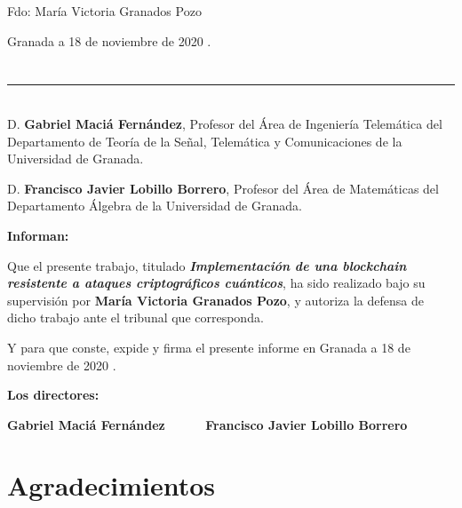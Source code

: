 \vspace{6cm}

\noindent Fdo: María Victoria Granados Pozo

\vspace{2cm}

\begin{flushright}
Granada a 18 de noviembre de 2020 .
\end{flushright}


\chapter*{}
\thispagestyle{empty}

\noindent\rule[-1ex]{\textwidth}{2pt}\\[4.5ex]

D. \textbf{Gabriel Maciá Fernández}, Profesor del Área de Ingeniería Telemática del Departamento de Teoría de la Señal, Telemática y Comunicaciones de la Universidad de Granada.

\vspace{0.5cm}

D. \textbf{Francisco Javier Lobillo Borrero}, Profesor del Área de Matemáticas del Departamento Álgebra de la Universidad de Granada.


\vspace{0.5cm}

\textbf{Informan:}

\vspace{0.5cm}

Que el presente trabajo, titulado \textit{\textbf{ Implementación de una blockchain resistente a ataques criptográficos cuánticos}},
ha sido realizado bajo su supervisión por \textbf{María Victoria Granados Pozo}, y autoriza la defensa de dicho trabajo ante el tribunal
que corresponda.

\vspace{0.5cm}

Y para que conste, expide y firma el presente informe en Granada a 18 de noviembre de 2020 .

\vspace{1cm}

\textbf{Los directores:}

\vspace{5cm}

\noindent \textbf{Gabriel Maciá Fernández \ \ \ \ \ Francisco Javier Lobillo Borrero}

\chapter*{Agradecimientos}
\thispagestyle{empty}

